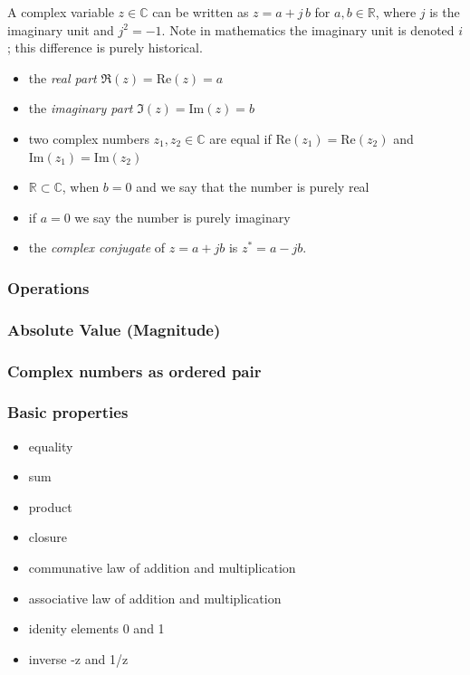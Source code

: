 A complex variable $z\in\mathbb{C}$ can be written as $z = a + j\, b$ for $a,b\in\mathbb{R}$, where $j$ is the imaginary unit and $j^2 = -1$. Note in mathematics the imaginary unit is denoted $i$; this difference is purely historical. 

\begin{itemize}
\item the \emph{real part} $\Re(z) = \text{Re}(z) = a$
\item the \emph{imaginary part} $\Im(z) = \text{Im}(z) = b$
\item two complex numbers $z_1, z_2\in \mathbb{C}$ are equal if $\text{Re}(z_1) = \text{Re}(z_2)$ and $\text{Im}(z_1) = \text{Im}(z_2)$
\item $\mathbb{R} \subset \mathbb{C}$, when $b = 0$ and we say that the number is purely real
\item if $a = 0$ we say the number is purely imaginary
\item the \emph{complex conjugate} of $z = a + jb$ is $z^* = a - jb$.
\end{itemize}

\subsubsection*{Operations}


\subsubsection*{Absolute Value (Magnitude)}

\subsubsection*{Complex numbers as ordered pair}

\subsubsection*{Basic properties}

\begin{itemize}
\item equality
\item sum
\item product
\item closure
\item communative law of addition and multiplication
\item associative law of addition and multiplication
\item idenity elements 0 and 1
\item inverse -z and 1/z
\end{itemize}
